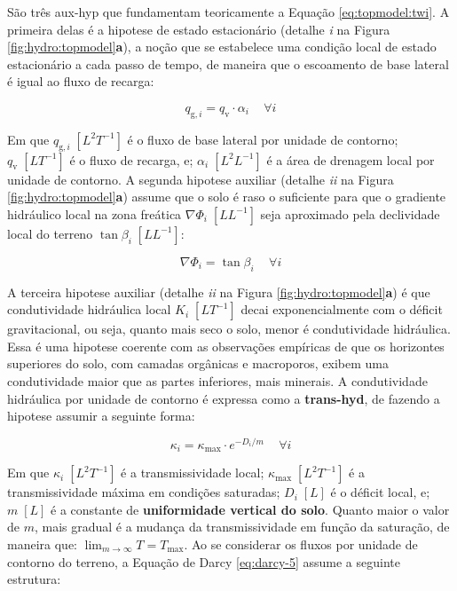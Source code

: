 \documentclass[./main.tex]{subfiles}
\begin{document}
\par São três \gls{aux-hyp} que fundamentam teoricamente a Equação \eqref{eq:topmodel:twi}. A primeira delas é a \gls{hipotese} de estado estacionário (detalhe \textit{i} na Figura \ref{fig:hydro:topmodel}\textbf{a}), a noção que se estabelece uma condição local de estado estacionário a cada passo de tempo, de maneira que o escoamento de base lateral é igual ao fluxo de recarga:
\begin{linenomath*}
\begin{equation}
\label{eq:topmodel:prem1}
q_{\text{g}, i} = q_{\text{v}} \cdot \alpha_{i}  \quad \, \forall i
\end{equation}
\end{linenomath*}
Em que $q_{\text{g}, i}\; [L^{2}T^{-1}]$ é o fluxo de base lateral por unidade de contorno; $q_{\text{v}}\; [LT^{-1}]$ é o fluxo de recarga, e; $\alpha_{i}\; [L^{2}L^{-1}]$ é a área de drenagem local por unidade de contorno. A segunda \gls{hipotese} auxiliar (detalhe \textit{ii} na Figura \ref{fig:hydro:topmodel}\textbf{a}) assume que o solo é raso o suficiente para que o gradiente hidráulico local na zona freática $\nabla \Phi_{i}\; [LL^{-1}]$ seja aproximado pela declividade local do terreno $\tan \beta_{i}\; [LL^{-1}]$:
\begin{linenomath*}
\begin{equation}
\label{eq:topmodel:prem2}
\nabla \Phi_{i} = \tan \beta_{i} \quad \, \forall i
\end{equation}
\end{linenomath*}
A terceira \gls{hipotese} auxiliar (detalhe \textit{ii} na Figura \ref{fig:hydro:topmodel}\textbf{a}) é que condutividade hidráulica local $K_{ i}\; [LT^{-1}]$ decai exponencialmente com o déficit gravitacional, ou seja, quanto mais seco o solo, menor é condutividade hidráulica. Essa é uma \gls{hipotese} coerente com as observações empíricas de que os horizontes superiores do solo, com camadas orgânicas e macroporos, exibem uma condutividade maior que as partes inferiores, mais minerais. A condutividade hidráulica por unidade de contorno é expressa como a \textbf{\gls{trans-hyd}}, de fazendo a \gls{hipotese} assumir a seguinte forma: 
\begin{linenomath*}
\begin{equation}
\label{eq:topmodel:prem3}
\kappa_{i} = \kappa_{\text{max}} \cdot e^{-D_{i}/m}  \quad \, \forall i
\end{equation}
\end{linenomath*}
Em que $\kappa_{i}\; [L^{2}T^{-1}]$ é a transmissividade local; $\kappa_{\text{max}}\; [L^{2}T^{-1}]$ é a transmissividade máxima em condições saturadas; $D_{i}\; [L]$ é o déficit local, e; $m\; [L]$ é a constante de \textbf{uniformidade vertical do solo}. Quanto maior o valor de $m$, mais gradual é a mudança da transmissividade em função da saturação, de maneira que: $\lim_{m\to\infty} T = T_{\text{max}}$. Ao se considerar os fluxos por unidade de contorno do terreno, a Equação de Darcy \eqref{eq:darcy-5} assume a seguinte estrutura:
\end{document}
